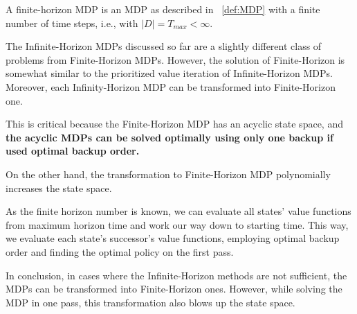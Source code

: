 \begin{definition}
A finite-horizon MDP is an MDP as described in ~\ref{def:MDP} with a finite number of time steps, i.e., with $|D| = T_{max} < \infty$.
\end{definition}


The Infinite-Horizon MDPs discussed so far are a slightly different class of problems from Finite-Horizon MDPs. However, the solution of Finite-Horizon is somewhat similar to the prioritized value iteration of Infinite-Horizon MDPs. 
Moreover, each Infinity-Horizon MDP can be transformed into Finite-Horizon one.

This is critical because the Finite-Horizon MDP has an acyclic state space, and \textbf{the acyclic MDPs can be solved optimally using only one backup if used optimal backup order.} \cite{Kolobov2012}

On the other hand, the transformation to Finite-Horizon MDP polynomially increases the state space.

As the finite horizon number is known, we can evaluate all states' value functions from maximum horizon time and work our way down to starting time. This way, we evaluate each state's successor's value functions, employing optimal backup order and finding the optimal policy on the first pass.

In conclusion, in cases where the Infinite-Horizon methods are not sufficient, the MDPs can be transformed into Finite-Horizon ones. However, while solving the MDP in one pass, this transformation also blows up the state space.

